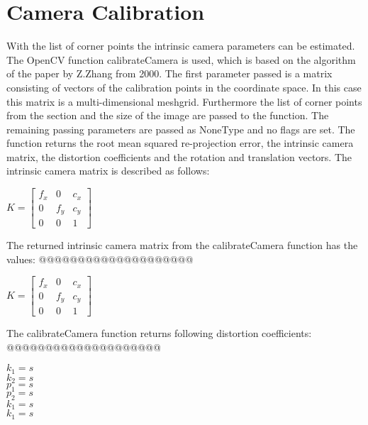 \documentclass[twocolumn,10pt]{asme2ej}
\begin{document}

\section{Camera Calibration}
\noindent

With the list of corner points the intrinsic camera parameters can be estimated. 
The OpenCV function calibrateCamera\cite{opencv_calibrateCamera} is used, which is based on the algorithm of the paper by Z.Zhang\cite{zhang2000flexible} from 2000. 
The first parameter passed is a matrix consisting of vectors of the calibration points in the coordinate space. In this case this matrix is a multi-dimensional meshgrid. Furthermore the list of corner points from the  section and the size of the image are passed to the function. The remaining passing parameters are passed as NoneType and no flags are set. The function returns the root mean squared re-projection error, the intrinsic camera matrix, the distortion coefficients and the rotation and translation vectors.
The intrinsic camera matrix is described as follows: 
\begin{center}
    $K = \begin{bmatrix}
   f_x & 0 & c_x \\
   0 & f_y & c_y \\
   0 & 0 & 1
   \end{bmatrix}
   $
    \label{eq_intrinsicmatrix}
\end{center}
The returned intrinsic camera matrix from the calibrateCamera function has the values:
@@@@@@@@@@@@@@@@@@@@
\begin{center}
    $K = \begin{bmatrix}
   f_x & 0 & c_x \\
   0 & f_y & c_y \\
   0 & 0 & 1
   \end{bmatrix}
   $
    \label{eq_calculatedintrinsicmatrix}
\end{center}
The calibrateCamera function returns following distortion coefficients:
@@@@@@@@@@@@@@@@@@@@
\begin{center}
    $k_1 = s$\\
    $k_2 = s$\\
    $p_1 = s$\\
    $p_2 = s$\\
    $k_1 = s$\\
    $k_1 = s$
    \label{eq_distcoeff}
\end{center}
\end{document}
